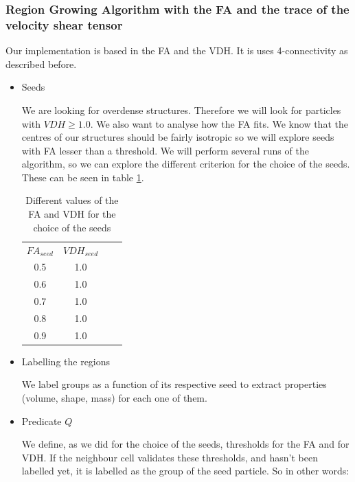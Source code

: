 \documentclass[12pt]{article}
\begin{document}
\subsubsection{Region Growing Algorithm with the FA and the trace of the velocity shear tensor}\label{sec:own_impl_descr}
Our implementation is based in the FA and the VDH. It is uses 4-connectivity as described before.

\begin{itemize}
    \item Seeds
\begin{par}
We are looking for overdense structures. Therefore we will look
for particles with $VDH \geq 1.0$.  We also want to analyse how
the FA fits. We know that the centres of our structures should be
fairly isotropic so we will explore seeds with FA lesser than a
threshold. We will perform several runs of the algorithm, so we
can explore the different criterion for the choice of the seeds.
These can be seen in table \ref{tab:seeds_FA_Trace}. 
\end{par}
 \begin{table}[ht]
    \centering
    \begin{tabular}{|c|c|c|c|}
        $FA_{seed}$ & $VDH_{seed}$ \\
        0.5 &  1.0 \\
        0.6 &  1.0 \\
        0.7 &  1.0 \\
        0.8 &  1.0 \\
        0.9 &  1.0 \\
    \end{tabular}
    \caption{Different values of the FA and VDH for the choice of the seeds}
    \label{tab:seeds_FA_Trace}
\end{table}
\FloatBarrier

\item Labelling the regions
\begin{par}
We label groups as a function of its respective
 seed to extract properties (volume, shape, mass)
  for each one of them.
\end{par}

\item Predicate $Q$

\begin{par}
We define, as we did for the
choice of the seeds, thresholds for the FA and for VDH. If
the neighbour cell validates these thresholds, and hasn't been
labelled yet, it is labelled as the group of the seed particle. So
in other words: \\


\end{par}
\end{itemize}
\end{document}
